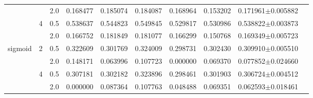 \documentclass[nocrop]{bioinfo}
\begin{document}
\begin{supplementary}
\begin{table}[h]
{\begin{tabular}{lllrrrrrrr}
		&   & 2.0 & \num{0.168477} & \num{0.185074} & \num{0.184087} & \num{0.168964} & \num{0.153202} & \num{0.171961}$\pm$\num{0.005882} \\
		\cline{2-10}
		& \multirow{2}{*}{4} & 0.5 & \num{0.538637} & \num{0.544823} & \num{0.549845} & \num{0.529817} & \num{0.530986} & \num{0.538822}$\pm$\num{0.003873} \\
		&   & 2.0 & \num{0.166752} & \num{0.181849} & \num{0.181077} & \num{0.166299} & \num{0.150768} & \num{0.169349}$\pm$\num{0.005723} \\
		\cline{1-10}
		\cline{2-10}
		\multirow{4}{*}{sigmoid} & \multirow{2}{*}{2} & 0.5 & \num{0.322609} & \num{0.301769} & \num{0.324009} & \num{0.298731} &\num{0.302430} & \num{0.309910}$\pm$\num{0.005510} \\
		&   & 2.0 & \num{0.148171} & \num{0.063996} & \num{0.107723} & \num{0.000000} & \num{0.069370} & \num{0.077852}$\pm$\num{0.024660} \\
		\cline{2-10}
		& \multirow{2}{*}{4} & 0.5 & \num{0.307181} & \num{0.302182} & \num{0.323896} & \num{0.298461} & \num{0.301903} & \num{0.306724}$\pm$\num{0.004512} \\
		&   & 2.0 & \num{0.000000} & \num{0.087364} & \num{0.107763} & \num{0.048488} & \num{0.069351} & \num{0.062593}$\pm$\num{0.018461} \\
		\bottomrule
	\end{tabular}
}
{}

{}
	 {

}
\end{table}
\end{supplementary}
\end{document}
